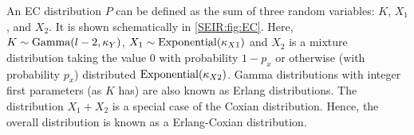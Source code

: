 \documentclass[thesis.tex]{subfiles}
\begin{document}

An EC distribution $P$ can be defined as the sum of three random variables: $K$, $X_1$, and $X_2$.
It is shown schematically in \cref{SEIR:fig:EC}.
Here, $K \sim \operatorname{Gamma}(l-2, \kappa_Y)$, $X_1 \sim \operatorname{Exponential}(\kappa_{X1})$ and $X_2$ is a mixture distribution taking the value 0 with probability $1-p_x$ or otherwise (\ie with probability $p_x$) distributed $\operatorname{Exponential}(\kappa_{X2})$.
Gamma distributions with integer first parameters (as $K$ has) are also known as Erlang distributions.
The distribution $X_1 + X_2$ is a special case of the Coxian distribution.
Hence, the overall distribution is known as a Erlang-Coxian distribution.
\end{document}
